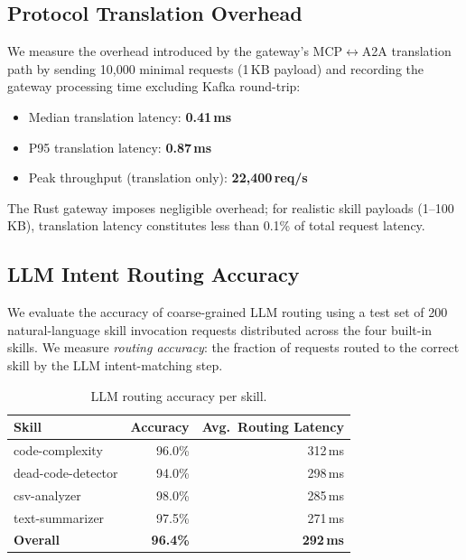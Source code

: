 \documentclass[sigconf,nonacm]{acmart}
\begin{document}
\subsection{Protocol Translation Overhead}

We measure the overhead introduced by the gateway's MCP$\leftrightarrow$A2A translation path by sending 10,000 minimal requests (1\,KB payload) and recording the gateway processing time excluding Kafka round-trip:

\begin{itemize}
  \item Median translation latency: \textbf{0.41\,ms}
  \item P95 translation latency: \textbf{0.87\,ms}
  \item Peak throughput (translation only): \textbf{22,400\,req/s}
\end{itemize}

The Rust gateway imposes negligible overhead; for realistic skill payloads (1--100\,KB), translation latency constitutes less than 0.1\% of total request latency.

\subsection{LLM Intent Routing Accuracy}

We evaluate the accuracy of coarse-grained LLM routing using a test set of 200 natural-language skill invocation requests distributed across the four built-in skills. We measure \emph{routing accuracy}: the fraction of requests routed to the correct skill by the LLM intent-matching step.

\begin{table}[h]
\centering
\caption{LLM routing accuracy per skill.}
\label{tab:routing}
\begin{tabular}{lrr}
\toprule
\textbf{Skill} & \textbf{Accuracy} & \textbf{Avg.\ Routing Latency} \\
\midrule
code-complexity       & 96.0\% & 312\,ms \\
dead-code-detector    & 94.0\% & 298\,ms \\
csv-analyzer          & 98.0\% & 285\,ms \\
text-summarizer       & 97.5\% & 271\,ms \\
\midrule
\textbf{Overall}      & \textbf{96.4\%} & \textbf{292\,ms} \\
\bottomrule
\end{tabular}
\end{table}
\end{document}
